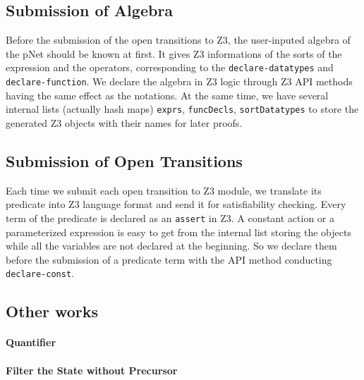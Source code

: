\documentclass[a4paper]{llncs}
\begin{document}
\subsection{Submission of Algebra}
Before the submission of the open transitions to Z3, the user-inputed algebra of the pNet should be known at first. It gives Z3 informations of the sorts of the expression and the operators, corresponding to the  
\texttt{declare-datatypes} and \texttt{declare-function}. We declare the algebra in Z3 logic through Z3 API methods having the same effect as the notations. At the same time, we have several internal lists (actually hash maps) \texttt{exprs}, \texttt{funcDecls}, \texttt{sortDatatypes} to store the generated Z3 objects with their names for later proofs.

\subsection{Submission of Open Transitions}
Each time we submit each open transition to Z3 module, we translate its predicate into Z3 language format and send it for satisfiability checking. Every term of the predicate is declared as an \texttt{assert} in Z3. A constant action or a parameterized expression is easy to get from the internal list storing the objects while all the variables are not declared at the beginning. So we declare them before the submission of a predicate term with the API method conducting \texttt{declare-const}.

\subsection{Other works}
\paragraph{Quantifier}
\paragraph{Filter the State without Precursor}
\end{document}
